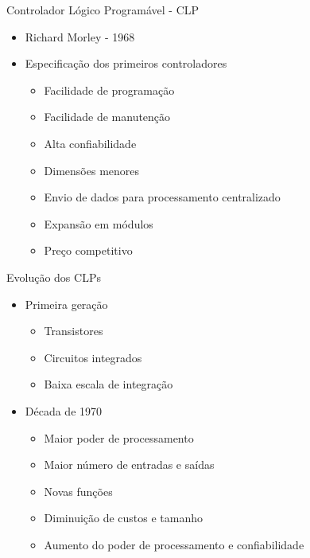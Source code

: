 \documentclass[aspectratio=169,
				xcolor=table]{beamer}
\begin{document}
	\begin{frame}{Controlador Lógico Programável - CLP}
		\begin{itemize}
			\item Richard Morley - 1968
			\vspace{1em}
			\item Especificação dos primeiros controladores
			\begin{itemize}
				\item Facilidade de programação
				\item Facilidade de manutenção 
				\item Alta confiabilidade
				\item Dimensões menores
				\item Envio de dados para processamento centralizado
				\item Expansão em módulos
				\item Preço competitivo

			\end{itemize}
		\end{itemize}
	\end{frame}
	
	\begin{frame}{Evolução dos CLPs}
		\begin{itemize}
			\item Primeira geração
			\begin{itemize}
				\item Transistores
				\item Circuitos integrados
				\item Baixa escala de integração
			\end{itemize}
			\vspace{1em}
			\item Década de 1970
			\begin{itemize}
				\item Maior poder de processamento
				\item Maior número de entradas e saídas
				\item Novas funções
				\item Diminuição de custos e tamanho
				\item Aumento do poder de processamento e confiabilidade
			\end{itemize}
		\end{itemize}
	\end{frame}
	
\end{document}
